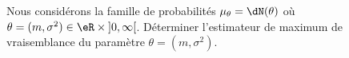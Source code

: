 
\begin{exercice}\label{exoModel-0005}

    Nous considérons la famille de probabilités \( \mu_{\theta}=\dN(\theta)\) où \( \theta=(m,\sigma^2)\in\eR\times\mathopen] 0 , \infty \mathclose[\). Déterminer l'estimateur de maximum de vraisemblance du paramètre \( \theta=(m,\sigma^2)\).

\end{exercice}
